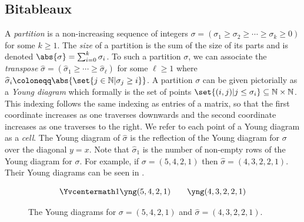 \documentclass[10pt,a4paper]{amsart}
\newcommand*\N{\mathbb{N}}
\newcommand*\defeq{\coloneqq}
\begin{document}
\subsection{Bitableaux}\label{sec:bitab}

\begin{defn}\label{defn:partitions}
    A \emph{partition} is a non-increasing sequence of integers $\sigma = (\sigma_1 \geq \sigma_2 \geq \cdots \geq \sigma_k \geq 0)$ for some $k \geq 1$.
    The \emph{size} of a partition is the sum of the size of its parts and is denoted $\abs{\sigma} = \sum_{i = 0}^k \sigma_i$.    
    To such a partition $\sigma$, we can associate the \emph{transpose} $\widehat{\sigma} = (\widehat{\sigma}_1 \geq \cdots \geq \widehat{\sigma}_\ell)$ for some $\ell \geq 1$ where $\widehat{\sigma}_i \defeq \abs{\set{j \in \N | \sigma_j \geq i}}$.
    A partition $\sigma$ can be given pictorially as a \emph{Young diagram} which formally is the set of points $\set{(i, j) | j \leq \sigma_i} \subseteq \N \times \N$.
    This indexing follows the same indexing as entries of a matrix, so that the first coordinate increases as one traverses downwards and the second coordinate increases as one traverses to the right.
    We refer to each point of a Young diagram as a \emph{cell}.
    The Young diagram of $\widehat{\sigma}$ is the reflection of the Young diagram for $\sigma$ over the diagonal $y = x$.
    Note that $\widehat{\sigma}_1$ is the number of non-empty rows of the Young diagram for $\sigma$.
    For example, if $\sigma = (5, 4, 2, 1)$ then $\widehat{\sigma} = (4, 3, 2, 2, 1)$.
    Their Young diagrams can be seen in .

    \begin{figure}[H]
        \centering
        \[
            \Yvcentermath1 \yng(5,4,2,1) \qquad \yng(4,3,2,2,1)
        \]
        \caption{
          The Young diagrams for $\sigma = (5, 4, 2, 1)$ and $\widehat{\sigma} = (4, 3, 2, 2, 1)$.
        }\label{fig:young_diagram_ex}
    \end{figure}
\end{defn}
\end{document}
